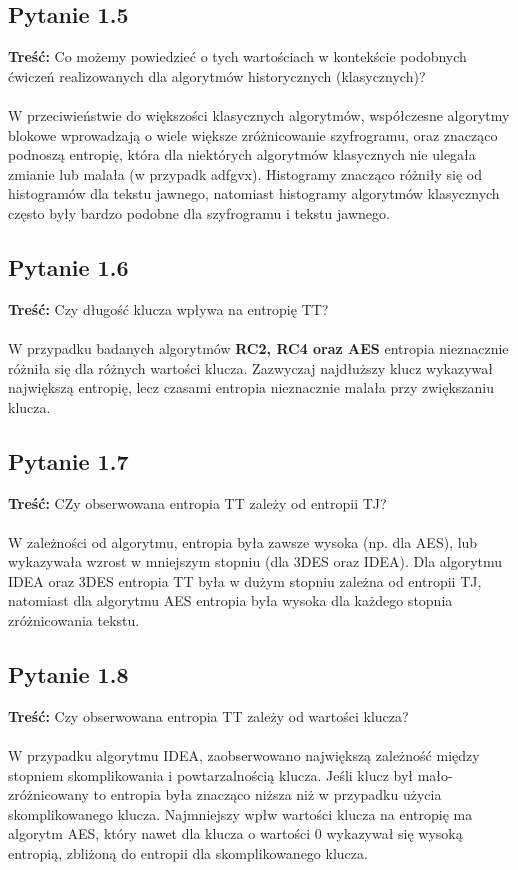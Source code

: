 \documentclass{article}
\begin{document}
\subsection{Pytanie 1.5}
    \textbf{Treść:} Co możemy powiedzieć o tych wartościach w kontekście podobnych ćwiczeń
    realizowanych dla algorytmów historycznych (klasycznych)?\\\\
    W przeciwieństwie do większości klasycznych algorytmów, współczesne algorytmy blokowe wprowadzają o wiele większe zróżnicowanie szyfrogramu,
    oraz znacząco podnoszą entropię, która dla niektórych algorytmów klasycznych nie ulegała zmianie lub malała (w przypadk adfgvx). Histogramy znacząco różniły
    się od histogramów dla tekstu jawnego, natomiast histogramy algorytmów klasycznych często były bardzo podobne dla szyfrogramu i tekstu jawnego.
\subsection{Pytanie 1.6}
    \textbf{Treść:} Czy długość klucza wpływa na entropię TT?\\\\
    W przypadku badanych algorytmów \textbf{RC2, RC4 oraz AES} entropia nieznacznie różniła się dla różnych wartości klucza. Zazwyczaj najdłuższy klucz wykazywał największą entropię,
    lecz czasami entropia nieznacznie malała przy zwiększaniu klucza.
\subsection{Pytanie 1.7}
    \textbf{Treść:} CZy obserwowana entropia TT zależy od entropii TJ?\\\\
    W zależności od algorytmu, entropia była zawsze wysoka (np. dla AES), lub wykazywała wzrost w mniejszym stopniu (dla 3DES oraz IDEA).
    Dla algorytmu IDEA oraz 3DES entropia TT była w dużym stopniu zależna od entropii TJ, natomiast dla algorytmu AES
    entropia była wysoka dla każdego stopnia zróżnicowania tekstu.
\subsection{Pytanie 1.8}
    \textbf{Treść:} Czy obserwowana entropia TT zależy od wartości klucza?  \\\\    
    W przypadku algorytmu IDEA, zaobserwowano największą zależność między stopniem skomplikowania i powtarzalnością klucza. Jeśli 
    klucz był mało-zróżnicowany to entropia była znacząco niższa niż w przypadku użycia skomplikowanego klucza. Najmniejszy wpłw wartości klucza na entropię
    ma algorytm AES, który nawet dla klucza o wartości 0 wykazywał się wysoką entropią, zbliżoną do entropii dla skomplikowanego klucza.
\end{document}
